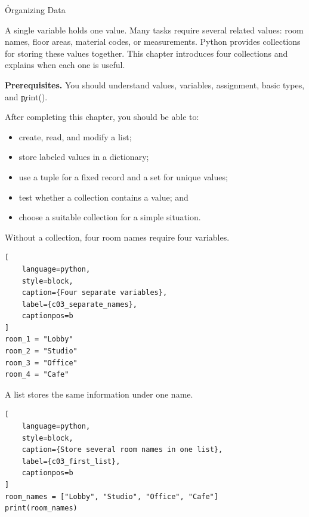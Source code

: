 
\h{Organizing Data}
\label{ch:03}

A single variable holds one value. Many tasks require several related values:
room names, floor areas, material codes, or measurements. Python provides
collections for storing these values together. This chapter introduces four
collections and explains when each one is useful.

\begin{NoteBox}
\textbf{Prerequisites.} You should understand values, variables, assignment,
basic types, and \c{print()}.
\end{NoteBox}

\begin{tcolorbox}[title=Learning outcomes,colframe=orange,colback=white,arc=2mm]
After completing this chapter, you should be able to:
\begin{itemize}
    \item create, read, and modify a list;
    \item store labeled values in a dictionary;
    \item use a tuple for a fixed record and a set for unique values;
    \item test whether a collection contains a value; and
    \item choose a suitable collection for a simple situation.
\end{itemize}
\end{tcolorbox}


Without a collection, four room names require four variables.

\begin{lstlisting}[
    language=python,
    style=block,
    caption={Four separate variables},
    label={c03_separate_names},
    captionpos=b
]
room_1 = "Lobby"
room_2 = "Studio"
room_3 = "Office"
room_4 = "Cafe"
\end{lstlisting}

A list stores the same information under one name.

\begin{lstlisting}[
    language=python,
    style=block,
    caption={Store several room names in one list},
    label={c03_first_list},
    captionpos=b
]
room_names = ["Lobby", "Studio", "Office", "Cafe"]
print(room_names)
\end{lstlisting}

